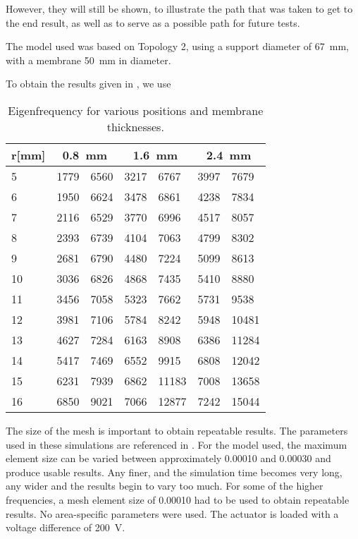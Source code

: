 However, they will still be shown, to illustrate the path that was taken to get
to the end result, as well as to serve as a possible path for future tests.

The model used was based on Topology 2, using a support diameter of
\SI{67}{\milli\metre}, with a membrane \SI{50}{\milli\metre} in diameter. 

To obtain the results given in , we use 

\begin{table}[h]
  \centering
    \begin{tabular}{l|l|l|l|l|l|l}
      r[mm]  & \multicolumn{2}{c|}{\SI{0.8}{\milli\metre}} &
		 \multicolumn{2}{c|}{\SI{1.6}{\milli\metre}} & 
		 \multicolumn{2}{c}{\SI{2.4}{\milli\metre}} \\
        \hline
        5  & 1779 & 6560 & 3217 & 6767  & 3997 & 7679  \\ 
        6  & 1950 & 6624 & 3478 & 6861  & 4238 & 7834  \\ 
        7  & 2116 & 6529 & 3770 & 6996  & 4517 & 8057  \\ 
        8  & 2393 & 6739 & 4104 & 7063  & 4799 & 8302  \\ 
        9  & 2681 & 6790 & 4480 & 7224  & 5099 & 8613  \\ 
        10 & 3036 & 6826 & 4868 & 7435  & 5410 & 8880  \\ 
        11 & 3456 & 7058 & 5323 & 7662  & 5731 & 9538  \\ 
        12 & 3981 & 7106 & 5784 & 8242  & 5948 & 10481 \\ 
        13 & 4627 & 7284 & 6163 & 8908  & 6386 & 11284 \\ 
        14 & 5417 & 7469 & 6552 & 9915  & 6808 & 12042 \\ 
        15 & 6231 & 7939 & 6862 & 11183 & 7008 & 13658 \\ 
        16 & 6850 & 9021 & 7066 & 12877 & 7242 & 15044 \\
    \end{tabular}
    \caption{Eigenfrequency for various positions and membrane thicknesses.}
    \label{tab:eigenfrequencies}
\end{table}

The size of the mesh is important to obtain repeatable results. The parameters
used in these simulations are referenced in . For the model used,
the maximum element size can be varied between approximately 0.00010 and 0.00030
and produce usable results. Any finer, and the simulation time becomes very
long, any wider and the results begin to vary too much. For some of the higher
frequencies, a mesh element size of 0.00010 had to be used to obtain repeatable
results.  No area-specific parameters were used. The actuator is loaded with a
voltage difference of \SI{200}{\volt}.

